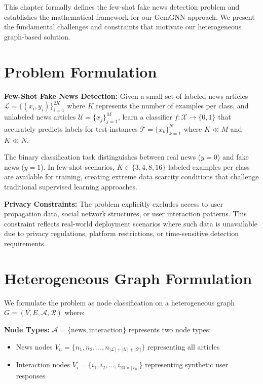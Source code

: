 
This chapter formally defines the few-shot fake news detection problem and establishes the mathematical framework for our GemGNN approach. We present the fundamental challenges and constraints that motivate our heterogeneous graph-based solution.

\section{Problem Formulation}

\textbf{Few-Shot Fake News Detection:} Given a small set of labeled news articles $\mathcal{L} = \{(x_i, y_i)\}_{i=1}^{2K}$ where $K$ represents the number of examples per class, and unlabeled news articles $\mathcal{U} = \{x_j\}_{j=1}^{M}$, learn a classifier $f: \mathcal{X} \rightarrow \{0,1\}$ that accurately predicts labels for test instances $\mathcal{T} = \{x_k\}_{k=1}^{N}$ where $K \ll M$ and $K \ll N$.

The binary classification task distinguishes between real news ($y = 0$) and fake news ($y = 1$). In few-shot scenarios, $K \in \{3,4,8,16\}$ labeled examples per class are available for training, creating extreme data scarcity conditions that challenge traditional supervised learning approaches.

\textbf{Privacy Constraints:} The problem explicitly excludes access to user propagation data, social network structures, or user interaction patterns. This constraint reflects real-world deployment scenarios where such data is unavailable due to privacy regulations, platform restrictions, or time-sensitive detection requirements.

\section{Heterogeneous Graph Formulation}

We formulate the problem as node classification on a heterogeneous graph $G = (V, E, \mathcal{A}, \mathcal{R})$ where:

\textbf{Node Types:} $\mathcal{A} = \{\text{news}, \text{interaction}\}$ represents two node types:
\begin{itemize}
\item News nodes $V_n = \{n_1, n_2, \ldots, n_{|\mathcal{L}| + |\mathcal{U}| + |\mathcal{T}|}\}$ representing all articles
\item Interaction nodes $V_i = \{i_1, i_2, \ldots, i_{20 \times |V_n|}\}$ representing synthetic user responses
\end{itemize}


